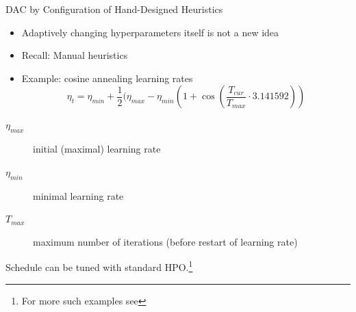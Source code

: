 \documentclass[main]{subfiles}
\begin{document}
\begin{frame}{DAC by Configuration of Hand-Designed Heuristics}%
    \begin{itemize}
        \item Adaptively changing hyperparameters itself is not a new idea
        \item Recall: Manual heuristics
        \item Example: cosine annealing learning rates 
        $$\eta_t=\eta_{min}+\frac{1}{2}(\eta_{max}-\eta_{min}\left(1+\cos\left(\frac{T_{cur}}{T_{max}}\cdot3.141592\right)\right)$$
    \end{itemize}\pause
    \begin{description}
        \item[$\eta_{max}$] initial (maximal) learning rate
        \item[$\eta_{min}$] minimal learning rate
        \item[$T_{max}$] maximum number of iterations (before restart of learning rate)
    \end{description}\pause
    Schedule can be tuned with standard HPO.\footnote{For more such examples see }
\end{frame}
\end{document}

